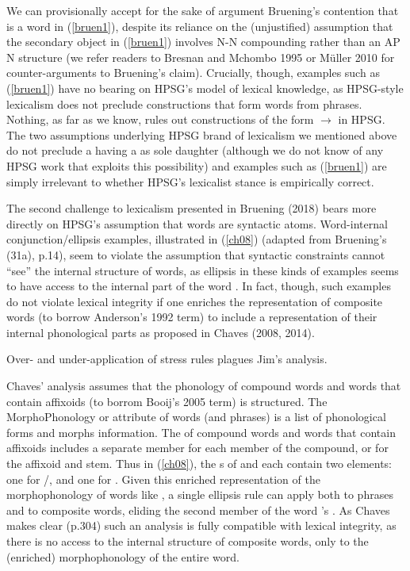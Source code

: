 \documentclass[output=paper]{langsci/langscibook}
\begin{document}
We can provisionally accept for the sake of argument Bruening's contention that  is a word in (\ref{bruen1}), despite its reliance on the (unjustified) assumption that the secondary object in (\ref{bruen1}) involves N-N compounding rather than an AP N structure (we refer readers to Bresnan and Mchombo 1995 or M\"uller 2010 for counter-arguments to Bruening's claim). Crucially, though, examples such as (\ref{bruen1}) have no bearing on HPSG's model of lexical knowledge, as HPSG-style lexicalism does not preclude constructions that form words from phrases. Nothing, as far as we know, rules out constructions of the form  $\rightarrow$  in HPSG. 
The two assumptions underlying HPSG brand of lexicalism we mentioned above do not preclude a  having a  as sole daughter (although we do not know of any HPSG work that exploits this possibility) and examples such as (\ref{bruen1}) are simply irrelevant to whether HPSG's lexicalist stance is empirically correct.

The second challenge to lexicalism presented in Bruening (2018) bears more directly on HPSG's assumption that words are syntactic atoms. Word-internal conjunction/ellipsis examples, illustrated in (\ref{ch08}) (adapted from Bruening's (31a), p.14), seem to violate the assumption that syntactic constraints cannot ``see'' the internal structure of words, as ellipsis in these kinds of examples seems to have access to the internal part of the word . In fact, though, such examples do not violate lexical integrity if one enriches the representation of composite words (to borrow Anderson's 1992 term) to include a representation of their internal phonological parts as proposed in Chaves (2008, 2014).

\begin{exe}
\ex\label{ch08}Over- and under-application of stress rules plagues Jim's analysis.
\end{exe} 

Chaves' analysis assumes that the phonology of compound words and words that contain affixoids (to borrom Booij's 2005 term) is structured. The MorphoPhonology or  attribute of words (and phrases) is a list of phonological forms and morphs information. The  of compound words and words that contain affixoids includes a separate member for each member of the compound, or for the affixoid and stem.  Thus in (\ref{ch08}), the s of  and  each contain two elements: one for /, and one for . Given this enriched representation of the morphophonology of words like , a single ellipsis rule can apply both to phrases and to composite words, eliding the second member of the word 's . As Chaves makes clear (p.304) such an analysis is fully compatible with lexical integrity, as there is no access to the internal structure of composite words, only to the (enriched) morphophonology of the entire word.
\end{document}
